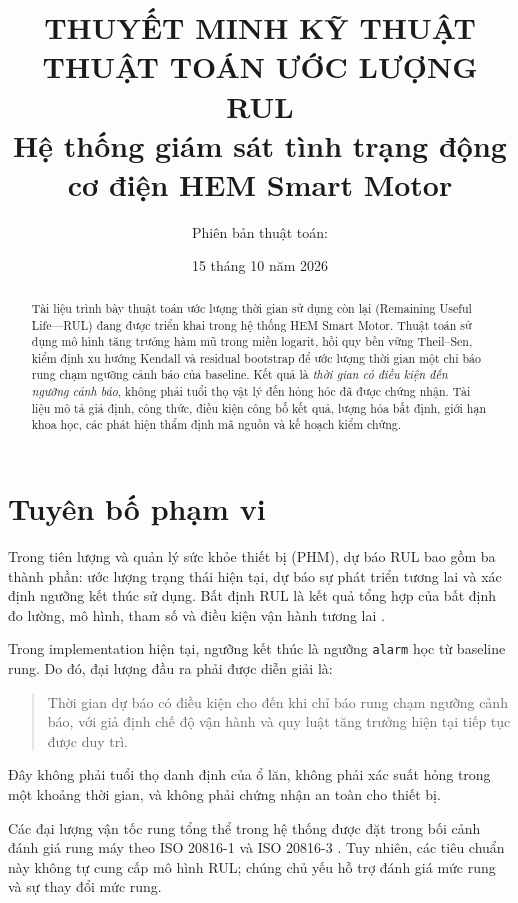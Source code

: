 \documentclass[12pt,a4paper]{article}
\title{\textbf{THUYẾT MINH KỸ THUẬT THUẬT TOÁN ƯỚC LƯỢNG RUL}\\[0.5em]
\large Hệ thống giám sát tình trạng động cơ điện HEM Smart Motor}
\author{Phiên bản thuật toán: \code{rul-exp-theilsen-v2}}
\date{15 tháng 10 năm 2026}
\newcommand{\code}[1]{\texttt{#1}}
\begin{document}
\maketitle

\begin{abstract}
Tài liệu trình bày thuật toán ước lượng thời gian sử dụng còn lại (Remaining Useful Life---RUL) đang được triển khai trong hệ thống HEM Smart Motor. Thuật toán sử dụng mô hình tăng trưởng hàm mũ trong miền logarit, hồi quy bền vững Theil--Sen, kiểm định xu hướng Kendall và residual bootstrap để ước lượng thời gian một chỉ báo rung chạm ngưỡng cảnh báo của baseline. Kết quả là \emph{thời gian có điều kiện đến ngưỡng cảnh báo}, không phải tuổi thọ vật lý đến hỏng hóc đã được chứng nhận. Tài liệu mô tả giả định, công thức, điều kiện công bố kết quả, lượng hóa bất định, giới hạn khoa học, các phát hiện thẩm định mã nguồn và kế hoạch kiểm chứng.
\end{abstract}

\tableofcontents
\newpage

\section{Tuyên bố phạm vi}

Trong tiên lượng và quản lý sức khỏe thiết bị (PHM), dự báo RUL bao gồm ba thành phần: ước lượng trạng thái hiện tại, dự báo sự phát triển tương lai và xác định ngưỡng kết thúc sử dụng. Bất định RUL là kết quả tổng hợp của bất định đo lường, mô hình, tham số và điều kiện vận hành tương lai \cite{sankararaman2013rul,sankararaman2013uncertain}.

Trong implementation hiện tại, ngưỡng kết thúc là ngưỡng \code{alarm} học từ baseline rung. Do đó, đại lượng đầu ra phải được diễn giải là:

\begin{quote}
Thời gian dự báo có điều kiện cho đến khi chỉ báo rung chạm ngưỡng cảnh báo, với giả định chế độ vận hành và quy luật tăng trưởng hiện tại tiếp tục được duy trì.
\end{quote}

Đây không phải tuổi thọ danh định của ổ lăn, không phải xác suất hỏng trong một khoảng thời gian, và không phải chứng nhận an toàn cho thiết bị.

Các đại lượng vận tốc rung tổng thể trong hệ thống được đặt trong bối cảnh đánh giá rung máy theo ISO 20816-1 và ISO 20816-3 \cite{iso20816-1,iso20816-3}. Tuy nhiên, các tiêu chuẩn này không tự cung cấp mô hình RUL; chúng chủ yếu hỗ trợ đánh giá mức rung và sự thay đổi mức rung.
\end{document}
